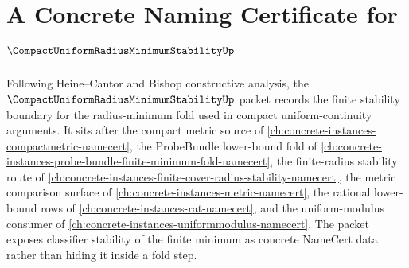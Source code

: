 \chapter{A Concrete Naming Certificate for $\CompactUniformRadiusMinimumStabilityUp$}
\label{ch:concrete-instances-compact-uniform-radius-minimum-stability-namecert}

Following Heine--Cantor and Bishop constructive analysis, the $\CompactUniformRadiusMinimumStabilityUp$ packet records the finite stability boundary for the radius-minimum fold used in compact uniform-continuity arguments. It sits after the compact metric source of \autoref{ch:concrete-instances-compactmetric-namecert}, the ProbeBundle lower-bound fold of \autoref{ch:concrete-instances-probe-bundle-finite-minimum-fold-namecert}, the finite-radius stability route of \autoref{ch:concrete-instances-finite-cover-radius-stability-namecert}, the metric comparison surface of \autoref{ch:concrete-instances-metric-namecert}, the rational lower-bound rows of \autoref{ch:concrete-instances-rat-namecert}, and the uniform-modulus consumer of \autoref{ch:concrete-instances-uniformmodulus-namecert}. The packet exposes classifier stability of the finite minimum as concrete NameCert data rather than hiding it inside a fold step.

